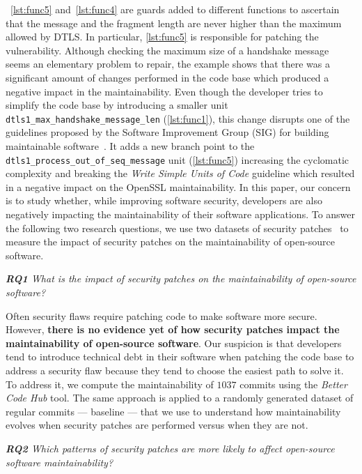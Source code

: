 \documentclass[sigconf,review]{acmart}
\begin{document}
~\ref{lst:func5} and~\ref{lst:func4} are guards added to different functions to
ascertain that the message and the fragment length are never higher than the
maximum allowed by DTLS. In particular, \ref{lst:func5} is responsible for patching
the vulnerability.
%
Although checking the maximum size of a handshake message seems an elementary
problem to repair, the example shows that there was a significant amount of
changes performed in the code base which produced a negative impact in the
maintainability. Even though the developer tries to simplify the
code base by introducing a smaller unit
\texttt{dtls1\_max\_handshake\_message\_len} (\ref{lst:func1}), this change disrupts
one of the guidelines proposed by the Software Improvement Group (SIG) for
building maintainable software~\cite{Visser:2016:OREILLY}. It adds a new branch
point to the \sloppy\texttt{dtls1\_process\_out\_of\_seq\_message} unit
(\ref{lst:func5}) increasing the cyclomatic complexity and breaking the
\emph{Write Simple Units of Code} guideline which resulted in a negative impact on the
OpenSSL maintainability.
In this paper, our concern is to study whether, while improving software
security, developers are also negatively impacting the maintainability of their
software applications. To answer the following two research questions, we use two datasets
of security patches~\cite{Reis:2017:IJSSE, 10.1109/MSR.2019.00064} to measure the impact of
security patches on the maintainability of open-source software.
%
\begin{framed}
\textit{\textbf{RQ1} What is the impact of security patches on the
maintainability of open-source software?}
\end{framed}
\vspace{-0.1cm}
%
Often security flaws require patching code to make software more secure.
However, \textbf{there is no evidence yet of how security patches impact the
maintainability of open-source software}. Our suspicion is that developers tend
to introduce technical debt in their software when patching the code base to
address a security flaw because they tend to choose the easiest path to solve
it. To address it, we compute the maintainability of $1037$ commits using the
\emph{Better Code Hub} tool. The same approach is applied to a randomly generated
dataset of regular commits --- baseline --- that we use to understand how
maintainability evolves when security patches are performed versus when
they are not.
%
\begin{framed}
\textit{\textbf{RQ2} Which patterns of security patches are more likely to
affect open-source software maintainability?}
\end{framed}
\end{document}
